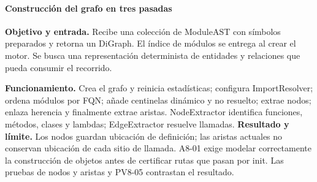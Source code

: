 \paragraph*{Construcción del grafo en tres pasadas}
\textbf{Objetivo y entrada.} Recibe una colección de ModuleAST con símbolos preparados y retorna un DiGraph. El índice de módulos se entrega al crear el motor. Se busca una representación determinista de entidades y relaciones que pueda consumir el recorrido.
\par\begingroup{}
\noindent\begin{minipage}{\textwidth}

\end{minipage}
\endgroup
{}
\textbf{Funcionamiento.} Crea el grafo y reinicia estadísticas; configura ImportResolver; ordena módulos por FQN; añade centinelas dinámico y no resuelto; extrae nodos; enlaza herencia y finalmente extrae aristas. NodeExtractor identifica funciones, métodos, clases y lambdas; EdgeExtractor resuelve llamadas. \textbf{Resultado y límite.} Los nodos guardan ubicación de definición; las aristas actuales no conservan ubicación de cada sitio de llamada. A8-01 exige modelar correctamente la construcción de objetos antes de certificar rutas que pasan por init. Las pruebas de nodos y aristas y PV8-05 contrastan el resultado.
